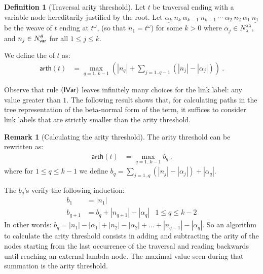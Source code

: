 \documentclass{article}
\theoremstyle{definition}
\newtheorem{definition}{Definition}[section]
\newtheorem{remark}{Remark}[section]
\newcommand\NodesVar{N_{\sf var}}%
\newcommand\NodesLmd{N_\lambda}%
\newcommand{\ghostlmd}{{\lambda\!\!\lambda}}
\newcommand{\ghostvar}{\theta}
\newcommand\arth{\textsf{arth}} %
\begin{document}
\begin{definition}[Traversal arity threshold]
\label{dfn:arity-threshold}
Let $t$ be traversal ending with a variable node hereditarily justified by the root.
Let $\underline{\alpha_k}\ n_k\ \alpha_{k-1}\ n_{k-1}\ \cdots\ \alpha_2\ n_2\ \alpha_1\ \underline{n_1}$ be the weave of $t$ ending at $t^\omega$, (so that $n_1 = t^\omega$) for some $k>0$  where $\alpha_j \in \NodesLmd^\ghostlmd$, and $n_j \in \NodesVar^\ghostvar$ for all $1\leq j\leq k$.

We define the  of $t$ as:
\begin{align*}
\arth(t) &= \max_{q=1..k-1} \left( |n_q| + \sum_{j=1..q-1} (|n_j| - |\alpha_j|) \right)\ .
\end{align*}
\end{definition}

Observe that rule $\mathbf{({\sf IVar})}$ leaves infinitely many choices for the link label: any value greater than $1$. The following result shows that, for calculating paths in the tree representation of the beta-normal form of the term, it suffices to consider link labels that are strictly smaller than the arity threshold.

\begin{remark}[Calculating the arity threshold]
The arity threshold can be rewritten as:
\begin{align*}
\arth(t) &= \max_{q=1..k-1} b_q \ .
\end{align*}
where for $1\leq q\leq k-1$ we define $b_q = \sum_{j=1..q} (|n_j| - |\alpha_j|) + |\alpha_q|$.

The $b_q$'s verify the following induction:
 \begin{align*}
 b_1 &= |n_1| \\
 b_{q+1} &= b_q + |n_{q+1}| - |\alpha_q| & \mbox{$1 \leq q \leq k-2$}
 \end{align*}
In other words: $b_{q} = |n_1| - |\alpha_1| + |n_2| - |\alpha_2| + \ldots + |n_{q-1}| - |\alpha_q| $. So an algorithm to calculate the arity threshold consists in adding and subtracting the arity of the nodes starting from the last occurrence of the traversal and reading backwards until reaching an external lambda node. The maximal value seen during that summation is the arity threshold.
\end{remark}
\end{document}
